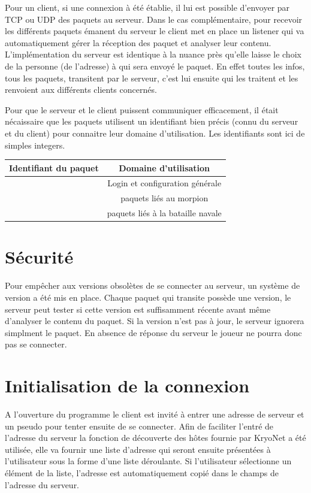 \documentclass{report}
\begin{document}
Pour un client, si une connexion à été établie, il lui est possible d'envoyer par
TCP ou UDP des paquets au serveur. Dans le cas complémentaire,
pour recevoir les différents paquets émanent du serveur le client met en place
un listener qui va automatiquement gérer la réception des paquet et analyser leur contenu.
L'implémentation du serveur est identique à la nuance près qu'elle laisse le choix
de la personne (de l'adresse) à qui sera envoyé le paquet. En effet toutes les infos, tous les paquets,
transitent par le serveur, c'est lui ensuite qui les traitent et les renvoient aux différents clients concernés.

Pour que le serveur et le client puissent communiquer efficacement, il était nécaissaire que les paquets utilisent un identifiant bien précis (connu du serveur et du client) pour connaitre leur domaine d'utilisation. Les identifiants sont ici de simples integers.

\begin{tabular}{|l|c|}
\hline
 Identifiant du paquet & Domaine d'utilisation \\
\hline [0-999] & Login et configuration générale \\
\hline[1000-1999] & paquets liés au morpion \\
\hline[2000-2999] & paquets liés à la bataille navale \\
\hline
\end{tabular}

\section{Sécurité}
Pour empêcher aux versions obsolètes de se connecter au serveur, un système de version a été mis en place.
Chaque paquet qui transite possède une version, le serveur peut tester si cette version est suffisamment
récente avant même d'analyser le contenu du paquet. Si la version n'est pas à jour, le serveur ignorera simplment le paquet.
En absence de réponse du serveur le joueur ne pourra donc pas se connecter.


\section{Initialisation de la connexion}
A l'ouverture du programme le client est invité à entrer une adresse de serveur
et un pseudo pour tenter ensuite de se connecter. Afin de faciliter l'entré de l'adresse du serveur la fonction de
découverte des hôtes fournie par KryoNet a été utilisée, elle va fournir une
liste d'adresse qui seront ensuite présentées à l'utilisateur sous la forme d'une liste déroulante.
Si l'utilisateur sélectionne un élément de la liste, l'adresse est automatiquement copié dans le champs de l'adresse du serveur.
\end{document}

